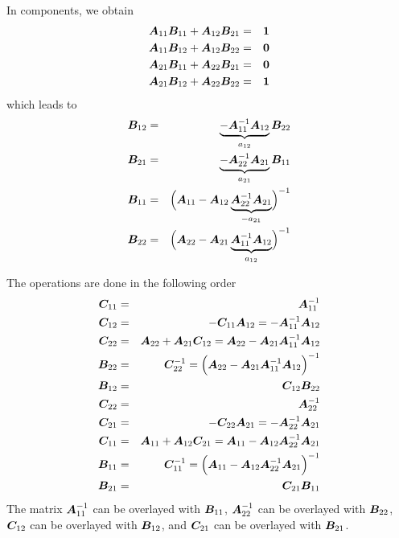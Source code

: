 \documentclass[11pt,a4paper]{report}
\begin{document}
In components, we obtain
\begin{eqnarray}
\bm{A}_{11}\bm{B}_{11}+\bm{A}_{12}\bm{B}_{21}&=&\bm{1}
\nonumber\\
\bm{A}_{11}\bm{B}_{12}+\bm{A}_{12}\bm{B}_{22}&=&\bm{0}
\nonumber\\
\bm{A}_{21}\bm{B}_{11}+\bm{A}_{22}\bm{B}_{21}&=&\bm{0}
\nonumber\\
\bm{A}_{21}\bm{B}_{12}+\bm{A}_{22}\bm{B}_{22}&=&\bm{1}
\end{eqnarray}
which leads to
\begin{eqnarray}
\bm{B}_{12}&=&\underbrace{-\bm{A}_{11}^{-1}\bm{A}_{12}}_{a_{12}}\bm{B}_{22}
\nonumber\\
\bm{B}_{21}&=&\underbrace{-\bm{A}_{22}^{-1}\bm{A}_{21}}_{a_{21}}\bm{B}_{11}
\nonumber\\
\bm{B}_{11}&=&\Bigl(\bm{A}_{11}
-\bm{A}_{12}\underbrace{\bm{A}_{22}^{-1}\bm{A}_{21}}_{-a_{21}}\Bigr)^{-1}
\nonumber\\
\bm{B}_{22}&=&\Bigl(\bm{A}_{22}
-\bm{A}_{21}\underbrace{\bm{A}_{11}^{-1}\bm{A}_{12}}_{a_{12}}\Bigr)^{-1}
\nonumber
\end{eqnarray}

The operations are done in the following order
\begin{eqnarray*}
\bm{C}_{11}&=&\bm{A}_{11}^{-1}
\nonumber\\
\bm{C}_{12}&=&-\bm{C}_{11}\bm{A}_{12}=-\bm{A}_{11}^{-1}\bm{A}_{12}
\nonumber\\
\bm{C}_{22}&=&\bm{A}_{22}+\bm{A}_{21}\bm{C}_{12}
=\bm{A}_{22}-\bm{A}_{21}\bm{A}_{11}^{-1}\bm{A}_{12}
\nonumber\\
\bm{B}_{22}&=&\bm{C}_{22}^{-1}
=\Bigl(\bm{A}_{22}-\bm{A}_{21}\bm{A}_{11}^{-1}\bm{A}_{12}\Bigr)^{-1}
\nonumber\\
\bm{B}_{12}&=&\bm{C}_{12}\bm{B}_{22}
\nonumber\\
\bm{C}_{22}&=&\bm{A}_{22}^{-1}
\nonumber\\
\bm{C}_{21}&=&-\bm{C}_{22}\bm{A}_{21}=-\bm{A}_{22}^{-1}\bm{A}_{21}
\nonumber\\
\bm{C}_{11}&=&\bm{A}_{11}+\bm{A}_{12}\bm{C}_{21}
=\bm{A}_{11}-\bm{A}_{12}\bm{A}_{22}^{-1}\bm{A}_{21}
\nonumber\\
\bm{B}_{11}&=&\bm{C}_{11}^{-1}
=\Bigl(\bm{A}_{11}-\bm{A}_{12}\bm{A}_{22}^{-1}\bm{A}_{21}\Bigr)^{-1}
\nonumber\\
\bm{B}_{21}&=&\bm{C}_{21}\bm{B}_{11}
\nonumber\\
\end{eqnarray*}
The matrix $\bm{A}_{11}^{-1}$ can be overlayed with $\bm{B}_{11}$,
$\bm{A}_{22}^{-1}$ can be overlayed with $\bm{B}_{22}$,
$\bm{C}_{12}$ can be overlayed with $\bm{B}_{12}$,
and $\bm{C}_{21}$ can be overlayed with $\bm{B}_{21}$.
\end{document}
